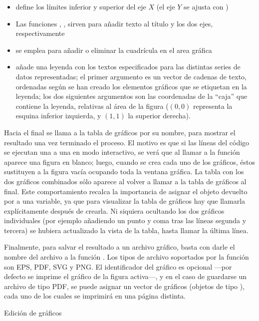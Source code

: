 ﻿\documentclass[spanish]{article}
\begin{document}
\begin{itemize}
\item {} define los límites
inferior y superior del eje $X$ (el eje $Y$ se ajusta con )
\item Las funciones , , 
sirven para añadir texto al título y los dos ejes, respectivamente
\item {} se emplea para añadir o eliminar la cuadrícula en el area gráfica
\item {} añade una leyenda con los textos especificados para las
distintas series de datos representadas; el primer argumento es un vector
de cadenas de texto, ordenadas según se han creado los
elementos gráficos que se etiquetan en la leyenda; los dos siguientes argumentos
son las coordenadas de la ``caja'' que contiene la leyenda, relativas al
área de la figura ($(0,0)$ representa la esquina inferior izquierda, y
$(1,1)$ la superior derecha).
\end{itemize}

Hacia el final se llama a la tabla de gráficos por su nombre, para mostrar el resultado
una vez terminado el proceso. El motivo es que si las líneas del código se ejecutan
una a una en modo interactivo, se verá que al llamar a la función 
aparece una figura en blanco; luego, cuando se crea
cada uno de los gráficos, éstos
sustituyen a la figura vacía ocupando toda la ventana gráfica.
La tabla con los dos gráficos combinados sólo aparece
al volver a llamar a la tabla de gráficos al final.
Este comportamiento recalca la importancia de
asignar el objeto devuelto por  a una variable, ya que
para visualizar la tabla de gráficos hay que llamarla explícitamente
después de crearla. Ni siquiera ocultando los dos gráficos individuales
(por ejemplo añadiendo un punto y coma tras las líneas segunda y tercera)
se hubiera actualizado la vista de la tabla, hasta llamar la última línea.

Finalmente, para salvar el resultado a un archivo gráfico,
basta con darle el nombre del archivo a la función .
Los tipos de archivo soportados por la función son
EPS, PDF, SVG y PNG. El identificador del gráfico es opcional ---por defecto
se imprime el gráfico de la figura activa---, y en el caso de guardarse un
archivo de tipo PDF, se puede asignar un vector de gráficos (objetos de tipo
), cada uno de los cuales se imprimirá en una página
distinta.

Edición de gráficos
\end{document}
